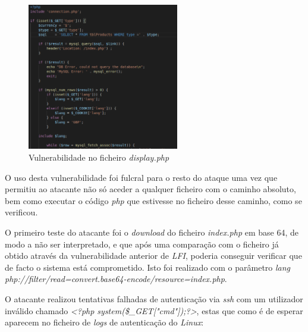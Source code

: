 \documentclass[10pt,english]{article}
\begin{document}
\begin{figure}[h]
    \centering
    \includegraphics[width=250]{images/display.png}
    \caption{Vulnerabilidade no ficheiro \textit{display.php}}
\end{figure}

\par O uso desta vulnerabilidade foi fulcral para o resto do ataque uma vez que permitiu ao atacante não só aceder a qualquer ficheiro com o caminho absoluto, bem como executar o código \textit{php} que estivesse no ficheiro desse caminho, como se verificou.

\par O primeiro teste do atacante foi o \textit{download} do ficheiro \textit{index.php} em base 64, de modo a não ser interpretado, e que após uma comparação com o ficheiro já obtido através da vulnerabilidade anterior de \textit{LFI}, poderia conseguir verificar que de facto o sistema está comprometido. Isto foi realizado com o parâmetro \textit{lang} \textit{php://filter/read=convert.base64-encode/resource=index.php}.

\par O atacante realizou tentativas falhadas de autenticação via \textit{ssh} com um utilizador inválido chamado \textit{<?php system(\$\_GET["cmd"]);?>}, estas que como é de esperar aparecem no ficheiro de \textit{logs} de autenticação do \textit{Linux}:
\end{document}

